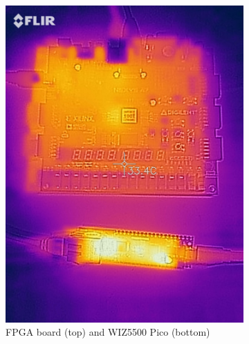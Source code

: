 \begin{figure}[h]
    \centering
    \begin{subfigure}[b]{0.45\textwidth} %
        \includegraphics[width=\textwidth]{Images/flir_2hs.jpg}
        \caption{FPGA board (top) and WIZ5500 Pico (bottom)}
        \label{fig:thermal_2hr_fpga_pico}
    \end{subfigure}
    \hfill %
    \begin{subfigure}[b]{0.45\textwidth} %

\end{subfigure}
\end{figure}
